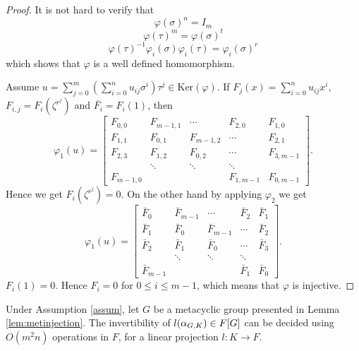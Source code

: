 \begin{proof}
It is not hard to verify that 
$$\varphi(\sigma)^n = I_m$$
$$\varphi(\tau)^m = \varphi(\sigma)^t$$
$$\varphi(\tau)^{-1}\varphi_i(\sigma) \varphi_i(\tau) = \varphi_i(\sigma)^r$$
which shows that $\varphi$ is a well defined homomorphism. 

Assume $u = \sum_{j = 0}^m \left( \sum_{i = 0}^n u_{ij} \sigma^i \right) \tau^j \in \mathrm{Ker}(\varphi).$ If
$F_j(x) = \sum_{i = 0}^n u_{ij}x^i$, $F_{i,j} = F_i(\zeta^{r^j})$ and $\bar{F_i} = F_i(1)$, then 
$$\varphi_1(u) = 
\left[\begin{array}{lllll}
F_{0,0} & F_{m-1,1}	& \cdots	&	F_{2,0} & F_{1,0}\\
F_{1,1} & F_{0,1}& F_{m-1,2} &\cdots & F_{2,1}\\
F_{2,3} & F_{1,2}& F_{0,2} &\cdots & F_{3,m-1}\\
&\ddots & \ddots & \ddots&\\
F_{m-1,0}	&	&	& F_{1,m-1}	& F_{0,m-1}
\end{array}
\right].
$$
Hence we get $F_i(\zeta^{r^j}) =0$. On the other hand by applying $\varphi_2$ we get
$$\varphi_1(u) = 
\left[\begin{array}{lllll}
\bar{F}_{0} & \bar{F}_{m-1}	& \cdots	&	\bar{F}_{2} & \bar{F}_{1}\\
\bar{F}_{1} & \bar{F}_{0}& \bar{F}_{m-1} &\cdots & \bar{F}_{2}\\
\bar{F}_{2} & \bar{F}_{1}& \bar{F}_{0} &\cdots & \bar{F}_{3}\\
&\ddots & \ddots & \ddots&\\
\bar{F}_{m-1}	&	&	& \bar{F}_{1}	& \bar{F}_{0}
\end{array}
\right].
$$
$F_i(1) = 0$. Hence
$F_i = 0$ for $0 \leq i \leq m-1$, which means that $\varphi$ is injective.
\end{proof}

\begin{proposition}
Under Assumption \ref{assum}, let $G$ be a metacyclic group presented in Lemma \ref{lem:metinjection}. The invertibility of $l(\alpha_{G,K}) \in F[G]$ can be decided using $O(m^2n)$ operations in $F$, for a linear projection $l: K\rightarrow F$.
\end{proposition}



